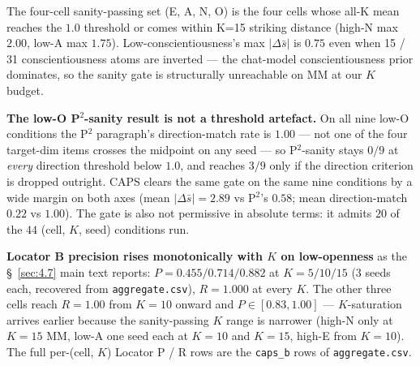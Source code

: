 The four-cell sanity-passing set (E, A, N, O) is the four cells whose all-K mean reaches the $1.0$ threshold or comes within K=15 striking distance (high-N max $2.00$, low-A max $1.75$). Low-conscientiousness's max $|\Delta\bar{s}|$ is $0.75$ even when 15 / 31 conscientiousness atoms are inverted --- the chat-model conscientiousness prior dominates, so the sanity gate is structurally unreachable on MM at our $K$ budget.

\textbf{The low-O P$^2$-sanity result is not a threshold artefact.} On all nine low-O conditions the P$^2$ paragraph's direction-match rate is $1.00$ --- not one of the four target-dim items crosses the midpoint on any seed --- so P$^2$-sanity stays $0/9$ at \textit{every} direction threshold below $1.0$, and reaches $3/9$ only if the direction criterion is dropped outright. CAPS clears the same gate on the same nine conditions by a wide margin on both axes (mean $|\Delta\bar{s}| = 2.89$ vs P$^2$'s $0.58$; mean direction-match $0.22$ vs $1.00$). The gate is also not permissive in absolute terms: it admits $20$ of the $44$ (cell, $K$, seed) conditions run.

\textbf{Locator B precision rises monotonically with $K$ on low-openness} as the \S~\ref{sec:4.7} main text reports: $P = 0.455 / 0.714 / 0.882$ at $K = 5 / 10 / 15$ (3 seeds each, recovered from \texttt{aggregate.csv}), $R = 1.000$ at every $K$. The other three cells reach $R = 1.00$ from $K = 10$ onward and $P \in [0.83, 1.00]$ --- $K$-saturation arrives earlier because the sanity-passing $K$ range is narrower (high-N only at $K = 15$ MM, low-A one seed each at $K = 10$ and $K = 15$, high-E from $K = 10$). The full per-(cell, $K$) Locator P / R rows are the \texttt{caps\_\allowbreak{}b} rows of \texttt{aggregate.csv}.


